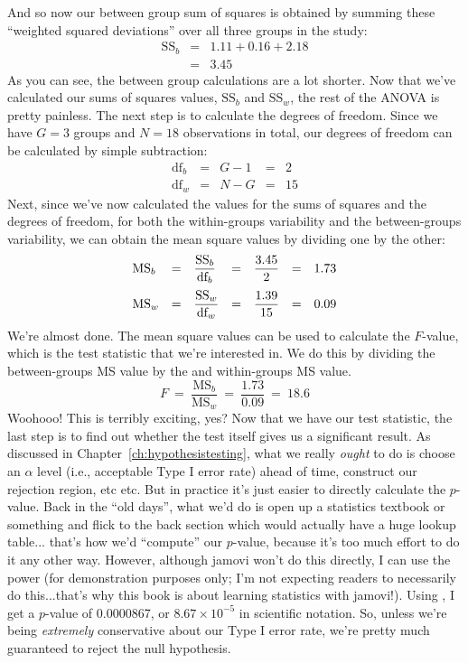 \noindent
And so now our between group sum of squares is obtained by summing these ``weighted squared deviations'' over all three groups in the study:
$$
\begin{array}{rcl}
\mbox{SS}_{b} &=& 1.11 + 0.16 + 2.18 \\
&=& 3.45
\end{array}
$$
As you can see, the between group calculations are a lot shorter. Now that we've calculated our sums of squares values, $\mbox{SS}_b$ and $\mbox{SS}_w$, the rest of the ANOVA is pretty painless. The next step is to calculate the degrees of freedom. Since we have $G = 3$ groups and $N = 18$ observations in total, our degrees of freedom can be calculated by simple subtraction:
$$
\begin{array}{lclcl}
\mbox{df}_b &=& G - 1 &=& 2 \\
\mbox{df}_w &=& N - G &=& 15 
\end{array}
$$
Next, since we've now calculated the values for the sums of squares and the degrees of freedom, for both the within-groups variability and the between-groups variability, we can obtain the mean square values by dividing one by the other:
$$
\begin{array}{lclclcl}
\mbox{MS}_b &=& \displaystyle\frac{\mbox{SS}_b }{  \mbox{df}_b } &=& \displaystyle\frac{3.45}{ 2}  &=& 1.73 \vspace*{6pt} \\ 
\mbox{MS}_w &=& \displaystyle\frac{\mbox{SS}_w }{  \mbox{df}_w } &=& \displaystyle\frac{1.39}{15} &=& 0.09
\end{array}
$$
We're almost done. The mean square values can be used to calculate the $F$-value, which is the test statistic that we're interested in. We do this by dividing the between-groups MS value by the and within-groups MS value.
$$
F \ = \ \frac{\mbox{MS}_b }{ \mbox{MS}_w } \ = \ \frac{1.73}{0.09} \ = \ 18.6
$$
Woohooo! This is terribly exciting, yes? Now that we have our test statistic, the last step is to find out whether the test itself gives us a significant result. As discussed in Chapter~\ref{ch:hypothesistesting}, what we really {\it ought} to do is choose an $\alpha$ level (i.e., acceptable Type I error rate) ahead of time, construct our rejection region, etc etc. But in practice it's just easier to directly calculate the $p$-value. Back in the ``old days'', what we'd do is open up a statistics textbook or something and flick to the back section which would actually have a huge lookup table... that's how we'd ``compute'' our $p$-value, because it's too much effort to do it any other way. However, although jamovi won't do this directly, I can use the power \R (for demonstration purposes only; I'm not expecting readers to necessarily do this...that's why this book is about learning statistics with jamovi!). Using \R, I get a $p$-value of 0.0000867, or $8.67 \times 10^{-5}$ in scientific notation. So, unless we're being {\it extremely} conservative about our Type I error rate, we're pretty much guaranteed to reject the null hypothesis. 

